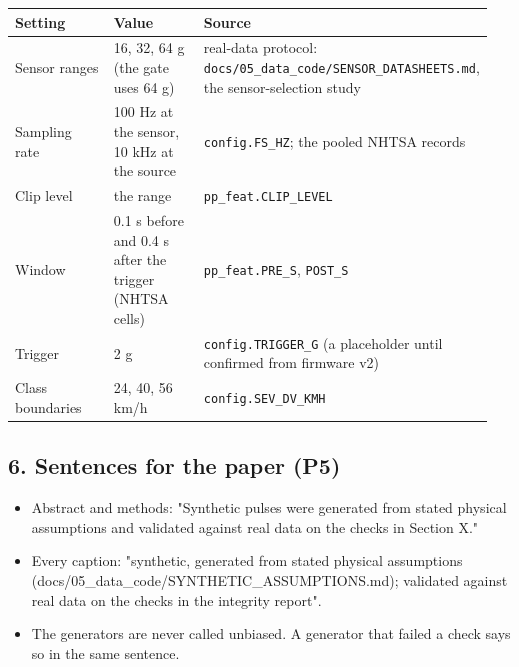 {\scriptsize\raggedright
\begin{longtable}{p{0.317\linewidth}p{0.317\linewidth}p{0.317\linewidth}}
\toprule
Setting & Value & Source \\
\midrule
\endhead
Sensor ranges & 16, 32, 64 g (the gate uses 64 g) & real-data protocol: \texttt{docs/05\_data\_code/SENSOR\_DATASHEETS.md}, the sensor-selection study \\
Sampling rate & 100 Hz at the sensor, 10 kHz at the source & \texttt{config.FS\_HZ}; the pooled NHTSA records \\
Clip level & the range & \texttt{pp\_feat.CLIP\_LEVEL} \\
Window & 0.1 s before and 0.4 s after the trigger (NHTSA cells) & \texttt{pp\_feat.PRE\_S}, \texttt{POST\_S} \\
Trigger & 2 g & \texttt{config.TRIGGER\_G} (a placeholder until confirmed from firmware v2) \\
Class boundaries & 24, 40, 56 km/h & \texttt{config.SEV\_DV\_KMH} \\
\bottomrule
\end{longtable}}

\subsection*{6. Sentences for the paper (P5)}

\begin{itemize}
\item Abstract and methods: "Synthetic pulses were generated from stated physical assumptions and validated against real data on the checks in Section X."
\item Every caption: "synthetic, generated from stated physical assumptions (docs/05\_data\_code/SYNTHETIC\_ASSUMPTIONS.md); validated against real data on the checks in the integrity report".
\item The generators are never called unbiased. A generator that failed a check says so in the same sentence.
\end{itemize}


